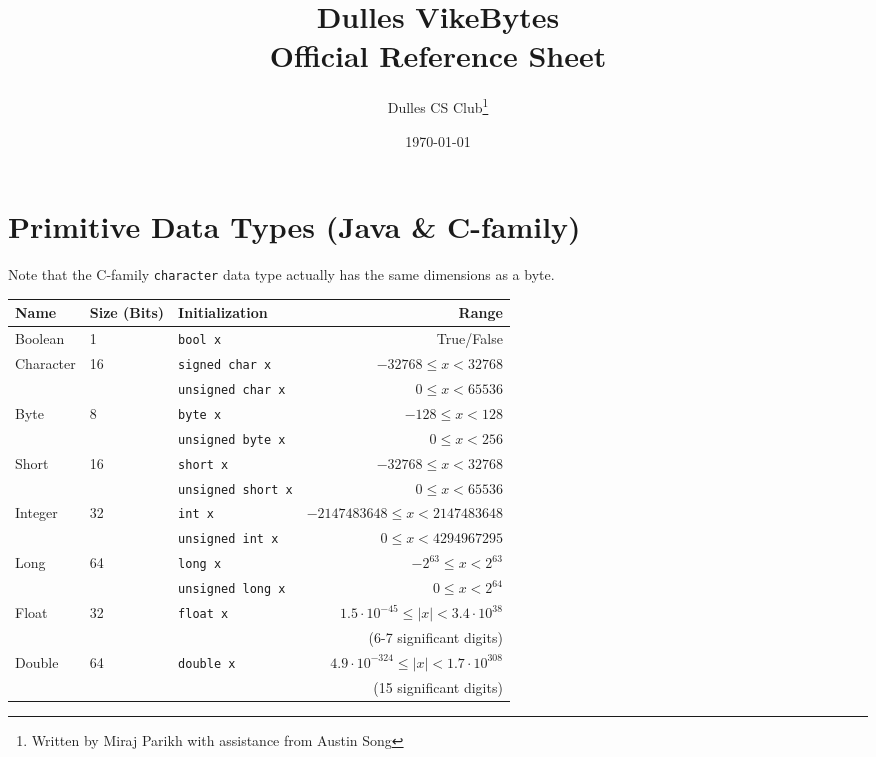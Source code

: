 \documentclass{article}
\title{Dulles VikeBytes\\Official Reference Sheet}
\date{\today}
\author{Dulles CS Club\thanks{Written by Miraj Parikh with assistance from Austin Song}}
\begin{document}

{\let\newpage\relax\maketitle} %

\renewcommand{\arraystretch}{1.25} %
\section{Primitive Data Types (Java \& C-family)}
Note that the C-family \lstinline|character| data type actually has the same dimensions as a byte.
\begin{center}\begin{tabular}{lllr}\toprule
  Name      &Size (Bits) &Initialization              &Range \\\midrule
  Boolean   &1           &\lstinline|bool x|          &True/False \\\midrule
  Character &16          &\lstinline|signed char x|   &\(-32768 \leq x < 32768\) \\ 
            &            &\lstinline|unsigned char x| &\(0 \leq x < 65536\) \\
  Byte      &8           &\lstinline|byte x|          &\(-128 \leq x < 128\) \\
            &            &\lstinline|unsigned byte x| &\(0 \leq x < 256\) \\
  Short     &16          &\lstinline|short x|         &\(-32768 \leq x < 32768\) \\
            &            &\lstinline|unsigned short x|&\(0 \leq x < 65536\) \\
  Integer   &32          &\lstinline|int x|           &\(-2147483648 \leq x < 2147483648\) \\
            &            &\lstinline|unsigned int x|  &\(0 \leq x < 4294967295\) \\
  Long      &64          &\lstinline|long x|          &\(-2^{63} \leq x < 2^{63}\) \\
            &            &\lstinline|unsigned long x| &\(0 \leq x < 2^{64}\) \\\midrule
  Float     &32          &\lstinline|float x|         &\(1.5\cdot10^{-45} \leq |x| < 3.4\cdot10^{38}\) \\
            &            &                            &(6-7 significant digits) \\
  Double    &64          &\lstinline|double x|        &\(4.9\cdot10^{-324} \leq |x| < 1.7\cdot10^{308}\) \\
            &            &                            &(15 significant digits) \\
\bottomrule\end{tabular}\end{center}
\end{document}

